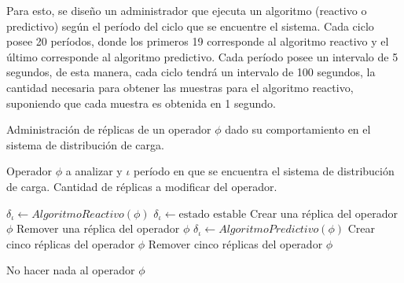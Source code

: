 Para esto, se diseño un administrador que ejecuta un algoritmo (reactivo o predictivo) según el período del ciclo que se encuentre el sistema. Cada ciclo posee 20 períodos, donde los primeros 19 corresponde al algoritmo reactivo y el último corresponde al algoritmo predictivo. Cada período posee un intervalo de 5 segundos, de esta manera, cada ciclo tendrá un intervalo de 100 segundos, la cantidad necesaria para obtener las muestras para el algoritmo reactivo, suponiendo que cada muestra es obtenida en 1 segundo.

\begin{algorithm}[!ht]
	\caption{Administración de réplicas de un operador $\phi$ dado su comportamiento en el sistema de distribución de carga.}
	\label{alg:administracion}
	\begin{algorithmic}[1]
	\REQUIRE Operador $\phi$ a analizar y $\iota$ período en que se encuentra el sistema de distribución de carga.
	\ENSURE Cantidad de réplicas a modificar del operador.	
	
		\STATE $\delta_{\iota} \leftarrow AlgoritmoReactivo(\phi)$
				\STATE $\delta_{\iota} \leftarrow \text{estado estable}$ 
				\RETURN Crear una réplica del operador $\phi$
			\ENDIF
			\RETURN Remover una réplica del operador $\phi$
		\ENDIF 
	\ELSE
		\STATE $\delta_{\iota} \leftarrow AlgoritmoPredictivo(\phi)$
				\RETURN Crear cinco réplicas del operador $\phi$
			\ENDIF
			\RETURN Remover cinco réplicas del operador $\phi$
		\ENDIF
	\ENDIF
	
	\RETURN No hacer nada al operador $\phi$
	
	\end{algorithmic}
\end{algorithm}

